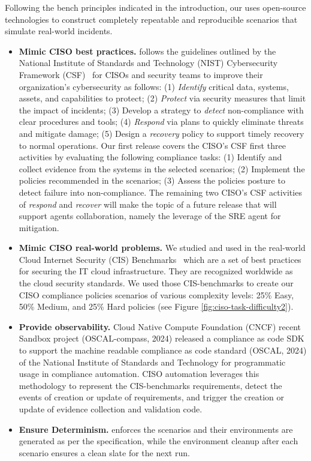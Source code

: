 Following the bench principles indicated in the introduction, our \bench uses open-source technologies to construct completely repeatable and reproducible  scenarios that simulate real-world incidents. 
\begin{itemize}[left=0pt, topsep=0pt, partopsep=0pt, itemsep=0pt, parsep=0pt]
    \item \textbf{Mimic CISO best practices.} \bench follows the guidelines outlined by the National Institute of Standards and Technology (NIST) Cybersecurity Framework (CSF)~\cite{NIST-CSF} for CISOs and security teams to improve their organization's cybersecurity as follows: (1) \textit{Identify} critical data, systems, assets, and capabilities to protect; (2) \textit{Protect} via security measures that limit the impact of incidents; (3) Develop a strategy to \textit{detect} non-compliance with clear procedures and tools; (4) \textit{Respond} via plans to quickly eliminate threats and mitigate damage; (5) Design a \textit{recovery} policy to support timely recovery to normal operations. Our first \bench release covers the CISO's CSF first three activities by evaluating the following compliance tasks: (1) Identify and collect evidence from the systems in the selected scenarios; (2) Implement the policies recommended in the scenarios; (3) Assess the policies posture to detect failure into non-compliance. The remaining two CISO's CSF activities of \textit{respond} and \textit{recover} will make the topic of a future \bench release that will support agents collaboration, namely the leverage of the SRE agent for mitigation. 
   
    \item \textbf{Mimic CISO real-world problems.} 
    We studied and used in \bench the real-world Cloud Internet Security (CIS) Benchmarks~\cite{cis-b} which are a set of best practices for securing the IT cloud infrastructure. They are recognized worldwide as the cloud security standards.
    We used those CIS-benchmarks to create our CISO compliance policies scenarios of various complexity levels: 25\% Easy, 50\% Medium, and 25\% Hard policies (see Figure \ref{fig:ciso-task-difficulty2}). 

    \item \textbf{Provide observability.} 
    Cloud Native Compute Foundation (CNCF) recent Sandbox project (OSCAL-compass, 2024) released a compliance as code SDK to support the machine readable compliance as code standard (OSCAL, 2024) of the
National Institute of Standards and Technology for programmatic usage in compliance automation. \bench CISO automation leverages this methodology to represent the CIS-benchmarks requirements, detect the events of creation or update of requirements, and trigger the creation or update of evidence collection and validation code.

    \item \textbf{{Ensure} Determinism.} \bench enforces the scenarios and their environments are generated as per the specification, while the environment cleanup after each scenario ensures a clean slate for the next run. 
\end{itemize}

